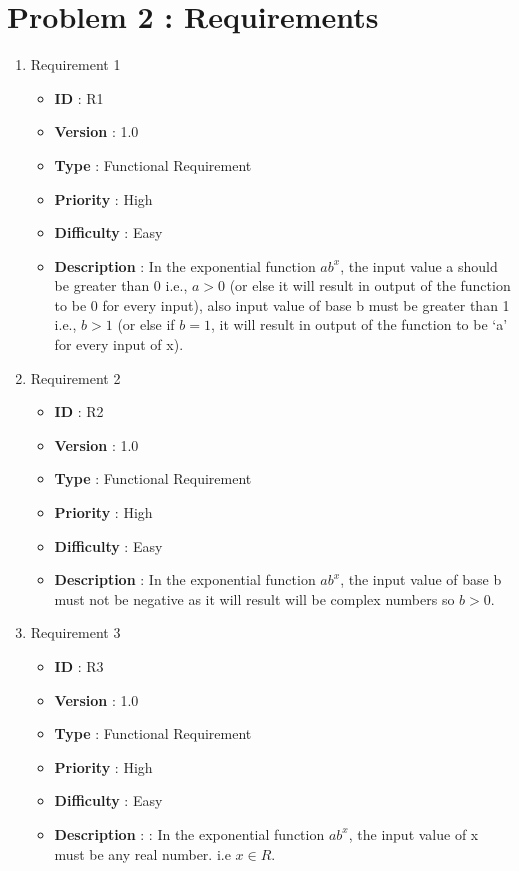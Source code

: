 \documentclass[12pt, a4paper]{article}
\begin{document}
\section{Problem 2 : Requirements}
\begin{enumerate}
    \item{} Requirement 1
        \begin{itemize}
        \item \textbf{ID} : R1
        \item \textbf{Version} : 1.0
        \item \textbf{Type} : Functional Requirement
        \item \textbf{Priority} : High
        \item \textbf{Difficulty} : Easy
        \item \textbf{Description} : In the exponential function $ ab^x $, the input value a should be greater than 0 i.e., $ a > 0 $ (or else it will result in output of the function to be 0 for every input), also input value of base b must be greater than 1 i.e., $ b > 1 $ (or else if $b = 1 $, it will result in output of the function to be ‘a’ for every input of x).
        \end{itemize}
    
    \item{} Requirement 2
        \begin{itemize}
        \item \textbf{ID} : R2
        \item \textbf{Version} : 1.0
        \item \textbf{Type} : Functional Requirement
        \item \textbf{Priority} : High
        \item \textbf{Difficulty} : Easy
        \item \textbf{Description} : In the exponential function $ab^x$, the input value of base b must not be negative as it will result will be complex numbers so $b > 0$.
        \end{itemize}
    
    \item{} Requirement 3
        \begin{itemize}
        \item \textbf{ID} : R3
        \item \textbf{Version} : 1.0
        \item \textbf{Type} : Functional Requirement
        \item \textbf{Priority} : High
        \item \textbf{Difficulty} : Easy
        \item \textbf{Description} : : In the exponential function $ab^x$, the input value of x must be any real number. i.e $x \in R$.
        \end{itemize}
    

\end{enumerate}
\end{document}
